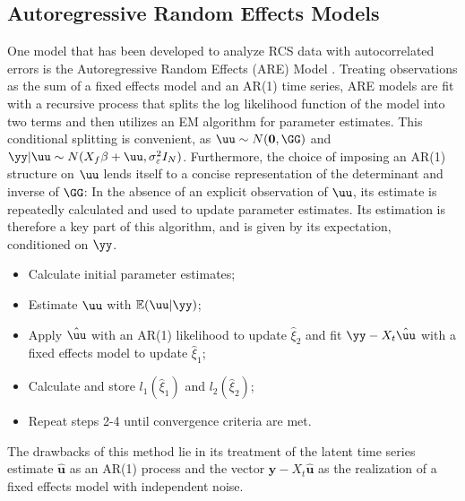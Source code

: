 \subsection{Autoregressive Random Effects Models}

One model that has been developed to analyze RCS data with autocorrelated errors is the Autoregressive Random Effects (ARE) Model \citep{modugno2015multilevel}. Treating observations as the sum of a fixed effects model and an AR(1) time series, ARE models are fit with a recursive process that splits the log likelihood function of the model into two terms and then utilizes an EM algorithm for parameter estimates. This conditional splitting is convenient, as $\uu \sim N(\mathbf{0},\GG)$ and $\yy|\uu \sim N(X_f\beta + \uu, \sigma_\varepsilon^2I_N)$. Furthermore, the choice of imposing an AR(1) structure on $\uu$ lends itself to a concise representation of the determinant and inverse of $\GG$:
In the absence of an explicit observation of $\uu$, its estimate is repeatedly calculated and used to update parameter estimates. Its estimation is therefore a key part of this algorithm, and is given by its expectation, conditioned on $\yy$.




\begin{itemize}
    \item[1)] Calculate initial parameter estimates; 
    \item[2)] Estimate $\uu$ with $\mathbb{E}(\uu|\yy)$;
    \item[3)] Apply $\hat{\uu}$ with an AR(1) likelihood to update $\hat{\xi}_2$ and fit $\yy - X_t\hat{\uu}$ with a fixed effects model to update $\hat{\xi}_1$;
    \item[4)] Calculate and store $l_1(\hat{\xi}_1)$ and $l_2(\hat{\xi}_2)$;
    \item[5)] Repeat steps 2-4 until convergence criteria are met.
\end{itemize}

The drawbacks of this method lie in its treatment of the latent time series estimate $\hat{\mathbf{u}}$ as an AR(1) process and the vector $\mathbf{y} - X_t\hat{\mathbf{u}}$ as the realization of a fixed effects model with independent noise. 
